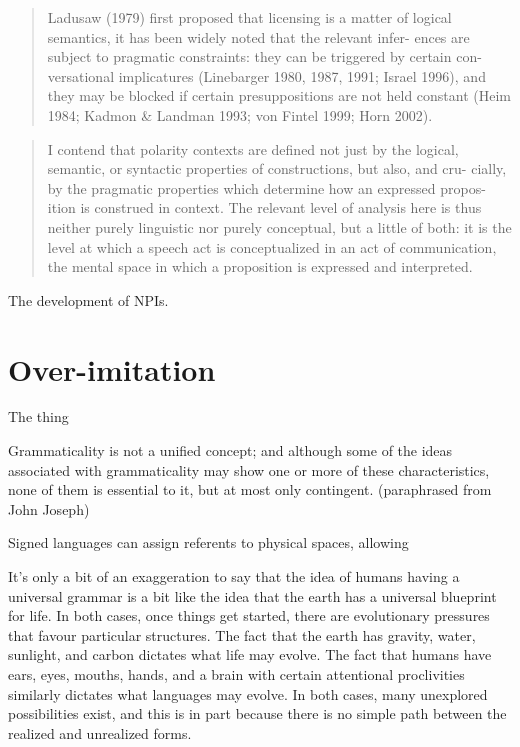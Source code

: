 \begin{quote}
    Ladusaw (1979) first proposed that licensing is a matter of logical semantics, it has been widely noted that the relevant infer- ences are subject to pragmatic constraints: they can be triggered by certain con- versational implicatures (Linebarger 1980, 1987, 1991; Israel 1996), and they may be blocked if certain presuppositions are not held constant (Heim 1984; Kadmon \& Landman 1993; von Fintel 1999; Horn 2002). \cite[61]{Israel2011}
\end{quote}

\begin{quote}
    I contend that polarity contexts are defined not just by the logical, semantic, or syntactic properties of constructions, but also, and cru- cially, by the pragmatic properties which determine how an expressed propos- ition is construed in context. The relevant level of analysis here is thus neither purely linguistic nor purely conceptual, but a little of both: it is the level at which a speech act is conceptualized in an act of communication, the mental space in which a proposition is expressed and interpreted. \cite[62]{Israel2011}
\end{quote}

The development of NPIs.

\section{Over-imitation}
The thing

Grammaticality is not a unified concept; and although some of the ideas associated with grammaticality may show one or more of these characteristics, none of them is essential to it, but at most only contingent. (paraphrased from John Joseph)

Signed languages can assign referents to physical spaces, allowing 


It's only a bit of an exaggeration to say that the idea of humans having a universal grammar is a bit like the idea that the earth has a universal blueprint for life. In both cases, once things get started, there are evolutionary pressures that favour particular structures. The fact that the earth has gravity, water, sunlight, and carbon dictates what life may evolve. The fact that humans have ears, eyes, mouths, hands, and a brain with certain attentional proclivities similarly dictates what languages may evolve. In both cases, many unexplored possibilities exist, and this is in part because there is no simple path between the realized and unrealized forms.

